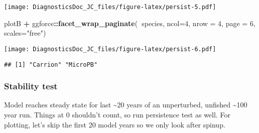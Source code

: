 \documentclass[
]{article}
\newenvironment{Shaded}{\begin{snugshade}}{\end{snugshade}}
\newcommand{\CommentTok}[1]{\textcolor[rgb]{0.56,0.35,0.01}{\textit{#1}}}
\newcommand{\DataTypeTok}[1]{\textcolor[rgb]{0.13,0.29,0.53}{#1}}
\newcommand{\DecValTok}[1]{\textcolor[rgb]{0.00,0.00,0.81}{#1}}
\newcommand{\FloatTok}[1]{\textcolor[rgb]{0.00,0.00,0.81}{#1}}
\newcommand{\KeywordTok}[1]{\textcolor[rgb]{0.13,0.29,0.53}{\textbf{#1}}}
\newcommand{\NormalTok}[1]{#1}
\newcommand{\OperatorTok}[1]{\textcolor[rgb]{0.81,0.36,0.00}{\textbf{#1}}}
\newcommand{\StringTok}[1]{\textcolor[rgb]{0.31,0.60,0.02}{#1}}
\begin{document}
\texttt{[image: DiagnosticsDoc\_JC\_files/figure-latex/persist-5.pdf]}

\begin{Shaded}
\begin{Highlighting}[]
\NormalTok{plotB }\OperatorTok{+}\StringTok{ }\NormalTok{ggforce}\OperatorTok{::}\KeywordTok{facet_wrap_paginate}\NormalTok{(}\OperatorTok{~}\NormalTok{species, }\DataTypeTok{ncol=}\DecValTok{4}\NormalTok{, }\DataTypeTok{nrow =} \DecValTok{4}\NormalTok{, }\DataTypeTok{page =} \DecValTok{6}\NormalTok{, }\DataTypeTok{scales=}\StringTok{"free"}\NormalTok{) }
\end{Highlighting}
\end{Shaded}

\texttt{[image: DiagnosticsDoc\_JC\_files/figure-latex/persist-6.pdf]}

\begin{Shaded}
\end{Shaded}

\begin{verbatim}
## [1] "Carrion" "MicroPB"
\end{verbatim}

\hypertarget{stability-test}{%
\subsubsection{Stability test}\label{stability-test}}

Model reaches steady state for last \textasciitilde20 years of an
unperturbed, unfished \textasciitilde100 year run. Things at 0 shouldn't
count, so run persistence test as well. For plotting, let's skip the
first 20 model years so we only look after spinup.
\end{document}
